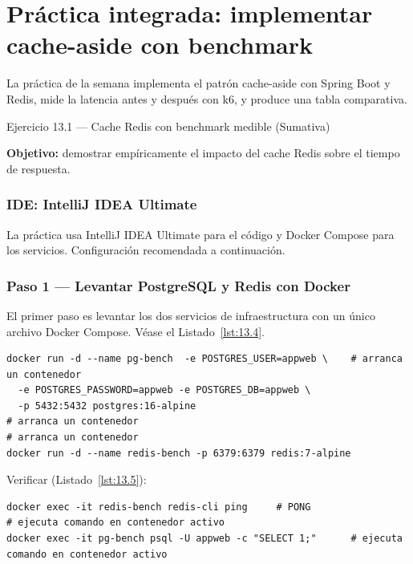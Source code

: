\documentclass[11pt,a4paper,openany]{book}
\begin{document}
\section{Práctica integrada: implementar cache-aside con benchmark}

La práctica de la semana implementa el patrón cache-aside
con Spring Boot y Redis, mide la latencia antes y después con k6, y
produce una tabla comparativa.


\begin{cajaejercicio}{Ejercicio 13.1 --- Cache Redis con benchmark medible (Sumativa)}

\textbf{Objetivo:} demostrar empíricamente el impacto del cache Redis
sobre el tiempo de respuesta.

\subsubsection*{IDE: IntelliJ IDEA Ultimate}

La práctica usa IntelliJ IDEA Ultimate para el código y
Docker Compose para los servicios. Configuración recomendada a
continuación.


\subsubsection*{Paso 1 --- Levantar PostgreSQL y Redis con Docker}

El primer paso es levantar los dos servicios de
infraestructura con un único archivo Docker Compose. V\'ease el Listado~\ref{lst:13.4}.


\begin{lstlisting}[style=shell,numbers=none,caption={Ejemplo de Shell},label=lst:13.4]
docker run -d --name pg-bench  -e POSTGRES_USER=appweb \    # arranca un contenedor
  -e POSTGRES_PASSWORD=appweb -e POSTGRES_DB=appweb \
  -p 5432:5432 postgres:16-alpine
# arranca un contenedor
# arranca un contenedor
docker run -d --name redis-bench -p 6379:6379 redis:7-alpine
\end{lstlisting}

Verificar (Listado~\ref{lst:13.5}):
\begin{lstlisting}[style=shell,numbers=none,caption={Ejemplo de Shell},label=lst:13.5]
docker exec -it redis-bench redis-cli ping     # PONG
# ejecuta comando en contenedor activo
docker exec -it pg-bench psql -U appweb -c "SELECT 1;"      # ejecuta comando en contenedor activo
\end{lstlisting}


\end{cajaejercicio}
\end{document}
